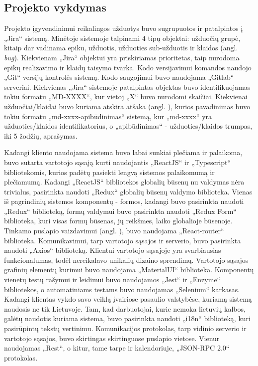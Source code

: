 \documentclass{VUMIFPSbakalaurinis}
\begin{document}
\subsection{Projekto vykdymas}

Projekto įgyvendinimui reikalingos užduotys buvo sugrupuotos ir patalpintos į „Jira“ sistemą. Minėtoje sistemoje talpinami 4 tipų objektai: užduočių grupė, kitaip dar vadinama epiku, užduotis, užduoties sub-užduotis ir klaidos (angl. \textit{bug}). Kiekvienam „Jira“ objektui yra priskiriamas prioritetas, taip nurodoma epikų realizavimo ir klaidų taisymo tvarka. Kodo versijavimui komandos naudojo „Git“ versijų kontrolės sistemą. Kodo saugojimui buvo naudojama „Gitlab“ serveriai. Kiekvienas „Jira“ sistemoje patalpintas objektas buvo identifikuojamas tokiu formatu „MD-XXXX“, kur vietoj „X“ buvo nurodomi skaičiai. Kiekvienai užduočiai/klaidai buvo kuriama atskira atšaka (angl. ), kurios pavadinimas buvo tokiu formatu „md-xxxx-apibūdinimas“ sistemą, kur „md-xxxx“ yra užduoties/klaidos identifikatorius, o „apibūdinimas“ - užduoties/klaidos trumpas, iki 5 žodžių, aprašymas.

Kadangi kliento naudojama sistema buvo labai sunkiai plečiama ir palaikoma, buvo sutarta vartotojo sąsają kurti naudojantis „ReactJS“ ir „Typescript“ bibliotekomis, kurios padėtų pasiekti lengvą sistemos palaikomumą ir plečiamumą. Kadangi „ReactJS“ bibliotekos globalių būsenų nu valdymas nėra trivialus, pasirinkta naudoti „Redux“ globalių būsenų valdymo biblioteka. Vienas iš pagrindinių sistemos komponentų - formos, kadangi buvo pasirinkta naudoti „Redux“ biblioteką, formų valdymui buvo pasirinkta naudoti „Redux Form“ biblioteka, kuri visas formų būsenas, jų reikšmes, laiko globalioje būsenoje. Tinkamo puslapio vaizdavimui (angl. ), buvo naudojama „React-router“ biblioteka. Komunikavimui, tarp vartotojo sąsajos ir serverio, buvo pasirinkta naudoti „Axios“ biblioteką. Klientui vartotojo sąsajoje yra svarbiausias funkcionalumas, todėl nereikalavo unikalių dizaino sprendimų. Vartotojo sąsajos grafinių elementų kūrimui buvo naudojama „MaterialUI“ biblioteka. Komponentų vienetų testų rašymui ir leidimui buvo naudojamos „Jest“ ir „Enzyme“ bibliotekos, o automatiniams testams buvo naudojamas „Selenium“ karkasas. Kadangi klientas vykdo savo veiklą įvairiose pasaulio valstybėse, kuriamą sistemą naudosis ne tik Lietuvoje. Tam, kad darbuotojai, kurie nemoka lietuvių kalbos, galėtų naudotis kuriama sistema, buvo pasirinkta naudoti „i18n“ biblioteką, kuri pasirūpintų tekstų vertinimu. Komunikacijos protokolas, tarp vidinio serverio ir vartotojo sąsajos, buvo skirtingas skirtinguose puslapio vietose. Vienur naudojamas „Rest“, o kitur, tame tarpe ir kalendoriuje, „JSON-RPC 2.0“ protokolas.
\end{document}
